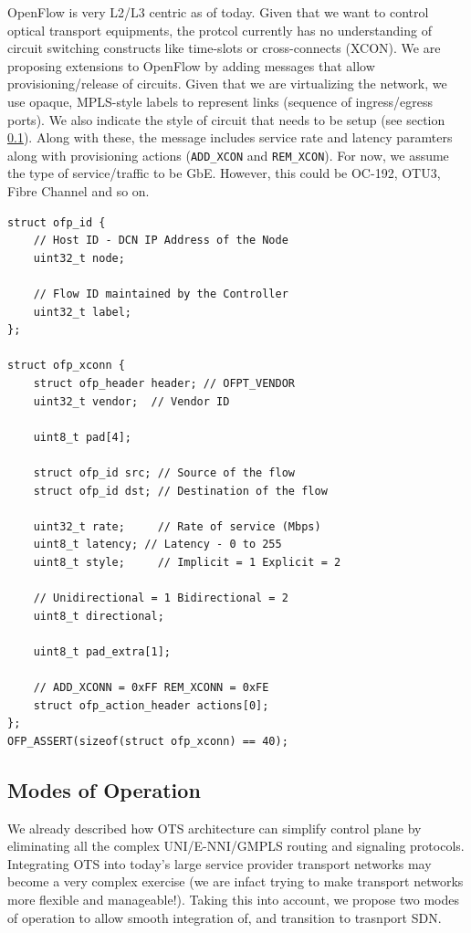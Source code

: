 \documentclass{sig-alternate-10pt}
\begin{document}
	OpenFlow \cite{OF1.0} is very L2/L3 centric as of today. Given that we want to control optical transport
	equipments, the protcol currently has no understanding of circuit switching constructs like time-slots or
	cross-connects (XCON). We are proposing extensions to OpenFlow by adding messages that allow provisioning/release of
	circuits. Given that we are virtualizing the network, we use opaque, MPLS-style labels to represent links
	(sequence of ingress/egress ports). We also indicate the style of circuit that needs to be setup (see
	section \ref{sec:modes}). Along with these, the message includes service rate and latency paramters along
	with provisioning actions (\texttt{ADD\_XCON} and \texttt{REM\_XCON}). For now, we assume the type of service/traffic 
	to be GbE. However, this could be OC-192, OTU3, Fibre Channel and so on.

	\begin{lstlisting}
struct ofp_id {
	// Host ID - DCN IP Address of the Node
	uint32_t node;

	// Flow ID maintained by the Controller
	uint32_t label;
};

struct ofp_xconn {
	struct ofp_header header; // OFPT_VENDOR
	uint32_t vendor;  // Vendor ID

	uint8_t pad[4];
		  
	struct ofp_id src; // Source of the flow
	struct ofp_id dst; // Destination of the flow
		   
	uint32_t rate;     // Rate of service (Mbps)
	uint8_t latency; // Latency - 0 to 255
	uint8_t style;     // Implicit = 1 Explicit = 2

	// Unidirectional = 1 Bidirectional = 2
	uint8_t directional;

	uint8_t pad_extra[1];

	// ADD_XCONN = 0xFF REM_XCONN = 0xFE
	struct ofp_action_header actions[0];
};
OFP_ASSERT(sizeof(struct ofp_xconn) == 40);
	\end{lstlisting}
	
	\subsection{Modes of Operation} \label{sec:modes}
	We already described how OTS architecture can simplify control plane by eliminating all the complex
	UNI/E-NNI/GMPLS routing and signaling protocols. Integrating OTS into today's large service provider transport
	networks may become a very complex exercise (we are infact trying to make transport networks more
	flexible and manageable!). Taking this into account, we propose two modes of operation to allow smooth
	integration of, and transition to trasnport SDN.
\end{document}

